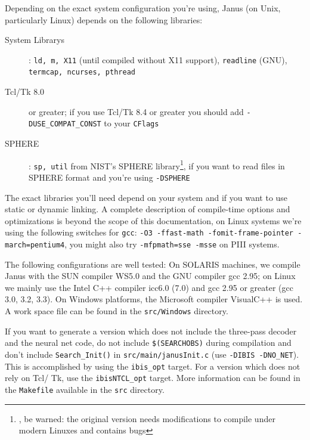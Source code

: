 \documentclass[a4paper,twoside]{book}
\begin{document}
Depending  on the exact system configuration   you're using, Janus (on
Unix, particularly Linux) depends on the following libraries:

\begin{description}

\item[System  Librarys]:  \texttt{ld, m, X11}  (until compiled without
X11     support),  \texttt{readline}  (GNU), \texttt{termcap, ncurses,
pthread}

\item[Tcl/Tk 8.0] or greater;  if you  use Tcl/Tk  8.4 or  greater you
should add \texttt{-DUSE\_COMPAT\_CONST} to your \texttt{CFlags}

\item[SPHERE]:     \texttt{sp,    util}  from      NIST's       SPHERE
library\footnote{,
be warned: the original version  needs modifications to compile  under
modern Linuxes and contains bugs}, if you want to read files in SPHERE
format and you're using \texttt{-DSPHERE}

\end{description}

The exact libraries you'll need depend on  your system and if you want
to use   static   or   dynamic linking. A   complete    description of
compile-time options and  optimizations  is beyond the scope   of this
documentation, on Linux systems we're using the following
switches  for        \texttt{gcc}:         \texttt{-O3     -ffast-math
-fomit-frame-pointer   -march=pentium4},    you   might   also     try
\texttt{-mfpmath=sse -msse} on PIII systems.

The following configurations are well tested:  On SOLARIS machines, we
compile Janus  with the SUN  compiler  WS5.0 and the  GNU compiler gcc
2.95; on Linux we mainly  use the Intel  C++ compiler icc6.0 (7.0) and
gcc 2.95 or greater  (gcc 3.0, 3.2,  3.3).  On Windows  platforms, the
Microsoft compiler  VisualC++ is used. A  work space file can be found
in the \texttt{src/Windows} directory.

If  you want to  generate  a version  which does not  include the three-pass
decoder and the neural net code, do not include \texttt{\$(SEARCHOBS)}
during  compilation  and  don't   include  \texttt{Search\_Init()}  in
\texttt{src/main/janusInit.c}  (use  \texttt{-DIBIS -DNO\_NET}).  This
is accomplished by using the \texttt{ibis\_opt} target.  For a version
which does not rely on Tcl/ Tk, use the \texttt{ibisNTCL\_opt} target.
More information can be  found  in the \texttt{Makefile} available  in
the \texttt{src} directory.
\end{document}
